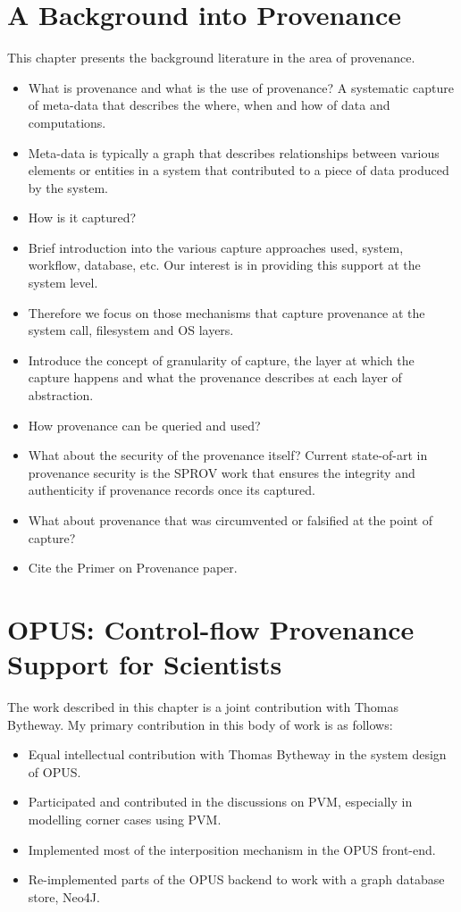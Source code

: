 \documentclass[withindex,glossary]{cam-thesis}
\begin{document}
\chapter{A Background into Provenance}
This chapter presents the background literature in the area of provenance.
\begin{itemize}
\item What is provenance and what is the use of provenance? A systematic capture of meta-data that describes the where, when and how of data and computations.
\item Meta-data is typically a graph that describes relationships between various elements or entities in a system that contributed to a piece of data produced by the system.
\item How is it captured?
\item Brief introduction into the various capture approaches used, system, workflow, database, etc. Our interest is in providing this support at the system level.
\item Therefore we focus on those mechanisms that capture provenance at the system call, filesystem and OS layers.
\item Introduce the concept of granularity of capture, the layer at which the capture happens and what the provenance describes at each layer of abstraction.
\item How provenance can be queried and used?
\item What about the security of the provenance itself? Current state-of-art in provenance security is the SPROV work that ensures the integrity and authenticity if provenance records once its captured.
\item What about provenance that was circumvented or falsified at the point of capture?
\item Cite the Primer on Provenance paper.
\end{itemize}

\chapter{OPUS: Control-flow Provenance Support for Scientists}
The work described in this chapter is a joint contribution with Thomas Bytheway. My primary contribution in this body of work is as follows:

\begin{itemize}
\item Equal intellectual contribution with Thomas Bytheway in the system design of OPUS.
\item Participated and contributed in the discussions on PVM, especially in modelling corner cases using PVM.
\item Implemented most of the interposition mechanism in the OPUS front-end.
\item Re-implemented parts of the OPUS backend to work with a graph database store, Neo4J.
\end{itemize}
\end{document}
